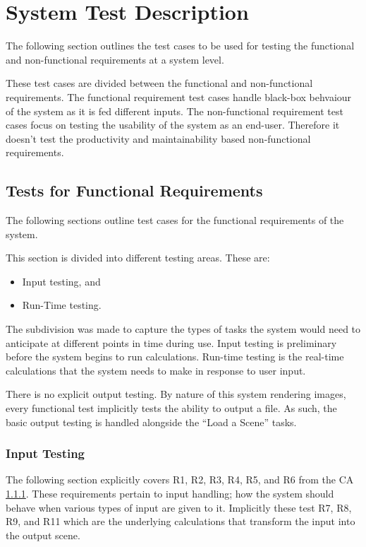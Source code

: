 \documentclass[12pt, titlepage]{article}
\begin{document}
\section{System Test Description}
The following section outlines the test cases to be used for testing the 
functional and non-functional requirements at a system level.

These test cases are divided between the functional and non-functional 
requirements. The functional requirement test cases handle black-box behvaiour 
of the system as it is fed different inputs. The non-functional requirement 
test cases focus on testing the usability of the system as an end-user. 
Therefore it doesn't test the productivity and maintainability based 
non-functional requirements.

\subsection{Tests for Functional Requirements}
The following sections outline test cases for the functional requirements of 
the system.

This section is divided into different testing areas. These are:

\begin{itemize}
	\item Input testing, and
	\item Run-Time testing.
\end{itemize}

The subdivision was made to capture the types of tasks the system would need to 
anticipate at different points in time during use. Input testing is preliminary 
before the system begins to run calculations. Run-time testing is the real-time 
calculations that the system needs to make in response to user input.

There is no explicit output testing. By nature of this system rendering images, 
every functional test implicitly tests the ability to output a file. As such, 
the basic output testing is handled alongside the ``Load a Scene'' tasks.

%

\subsubsection{Input Testing}
The following section explicitly covers R1, R2, R3, R4, R5, and R6 from the CA 
\ref{}. These requirements pertain to input handling; how the system should 
behave when various types of input are given to it. Implicitly these test R7, 
R8, R9, and R11 which are the underlying calculations that transform the input 
into the output scene.
\end{document}
